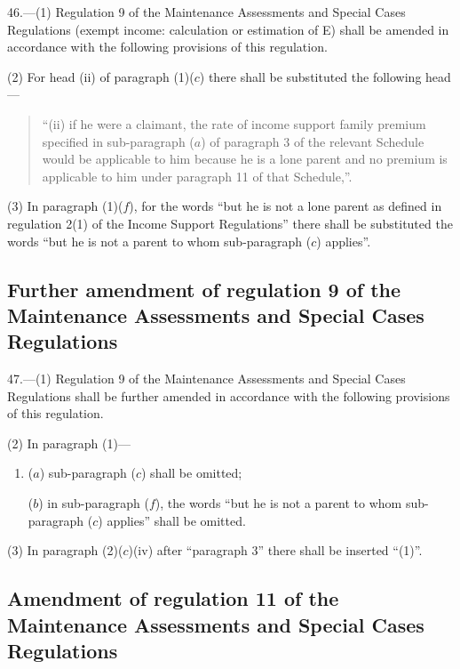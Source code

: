 \documentclass[12pt,a4paper]{article}
\begin{document}
46.—(1) Regulation 9 of the Maintenance Assessments and Special Cases Regulations (exempt income: calculation or estimation of E) shall be amended in accordance with the following provisions of this regulation.

(2) For head (ii) of paragraph (1)($c$) there shall be substituted the following head—
\begin{quotation}
“(ii) if he were a claimant, the rate of income support family premium specified in sub-paragraph ($a$) of paragraph 3 of the relevant Schedule would be applicable to him because he is a lone parent and no premium is applicable to him under paragraph 11 of that Schedule,”.
\end{quotation}

(3) In paragraph (1)($f$), for the words “but he is not a lone parent as defined in regulation 2(1) of the Income Support Regulations” there shall be substituted the words “but he is not a parent to whom sub-paragraph ($c$) applies”.

\subsection[47. Further amendment of regulation 9 of the Maintenance Assessments and Special Cases Regulations]{Further amendment of regulation 9 of the Maintenance Assessments and Special Cases Regulations}

47.—(1) Regulation 9 of the Maintenance Assessments and Special Cases Regulations shall be further amended in accordance with the following provisions of this regulation.

(2) In paragraph (1)—
\begin{enumerate}\item[]
($a$) sub-paragraph ($c$) shall be omitted;

($b$) in sub-paragraph ($f$), the words “but he is not a parent to whom sub-paragraph ($c$) applies” shall be omitted.
\end{enumerate}

(3) In paragraph (2)($c$)(iv) after “paragraph 3” there shall be inserted “(1)”.

\subsection[48. Amendment of regulation 11 of the Maintenance Assessments and Special Cases Regulations]{Amendment of regulation 11 of the Maintenance Assessments and Special Cases Regulations}
\end{document}
